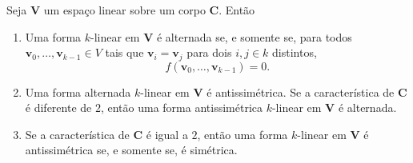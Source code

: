 \begin{prop}
Seja $\bm V$ um espaço linear sobre um corpo $\bm C$. Então
\begin{enumerate}
\item Uma forma $k$-linear em $\bm V$ é alternada se, e somente se, para todos $\bm v_0,\ldots,\bm v_{k-1} \in V$ tais que $\bm v_i = \bm v_j$ para dois $i,j \in k$ distintos,
	\begin{equation*}
	f(\bm v_0,\ldots,\bm v_{k-1})=0.
	\end{equation*} 
\item Uma forma alternada $k$-linear em $\bm V$ é antissimétrica. Se a característica de $\bm C$ é diferente de $2$, então uma forma antissimétrica $k$-linear em $\bm V$  é alternada.
\item Se a característica de $\bm C$ é igual a $2$, então uma forma $k$-linear em $\bm V$ é antissimétrica se, e somente se, é simétrica.
\end{enumerate}
\end{prop}
